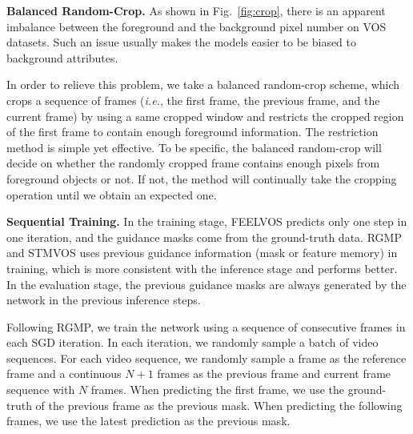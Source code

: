 \documentclass[runningheads]{llncs}
\def\ie{\emph{i.e.}}
\newcommand{\zongxin}[1]{#1}
\begin{document}
\setlength{\intextsep}{0pt}

\noindent\textbf{Balanced Random-Crop.}
As shown in Fig.~\ref{fig:crop}, there is an apparent imbalance between the foreground and the background pixel number on VOS datasets. Such an issue usually makes the models easier to be biased to background attributes. 

In order to relieve this problem, we take a balanced random-crop scheme, which crops a sequence of frames (\ie, the first frame, the previous frame, and the current frame) by using a same cropped window and restricts the cropped region of the first frame to contain enough foreground information. The restriction method is simple yet effective. To be specific, the balanced random-crop will decide on whether the randomly cropped frame contains enough pixels from foreground objects or not. If not, the method will continually take the cropping operation until we obtain an expected one.

\iffalse
\begin{figure}[!t]
    \center
        \texttt{[image: figs/sequence\_training.pdf]}
        \caption{An illustration of the sequential training. In each step, the previous mask comes from the previous prediction (the green lines) except for the first step, whose previous mask comes from the ground-truth mask (the blue line).}
        \label{fig:sequence_training}
\end{figure}
\fi

\noindent\textbf{Sequential Training.} \zongxin{In the training stage, FEELVOS predicts only one step in one iteration, and the guidance masks come from the ground-truth data. RGMP and STMVOS uses previous guidance information (mask or feature memory) in training, which is more consistent with the inference stage and performs better. In the evaluation stage, the previous guidance masks are always generated by the network in the previous inference steps.}

\zongxin{Following RGMP, we train the network using a sequence of consecutive frames in each SGD iteration. 
In each iteration, we randomly sample a batch of video sequences. For each video sequence, we randomly sample a frame as the reference frame and a continuous $N+1$ frames as the previous frame and current frame sequence with $N$ frames. When predicting the first frame, we use the ground-truth of the previous frame as the previous mask. When predicting the following frames, we use the latest prediction as the previous mask. 
}
\end{document}
